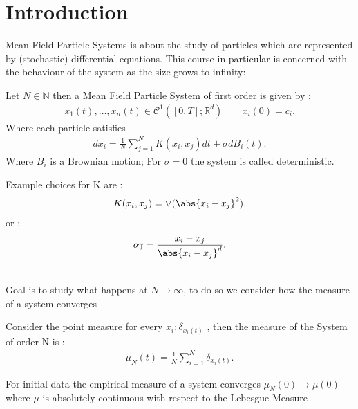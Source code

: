 \chapter{Introduction}
Mean Field Particle Systems is about the study of particles which are represented by (stochastic) differential equations.
This course in particular is concerned with the behaviour of the system as the size grows to infinity:
\begin{definition}
 Let $N \in  \mathbb{N}$ then a Mean Field Particle System of first order is given by : 
 \begin{align*}
   x_1(t),\ldots ,x_n(t) \in  \mathcal{C}^{1}([0,T];\mathbb{R}^{d } )  \qquad x_i(0) = c_i
 .\end{align*}
 Where each particle satisfies 
 \begin{align*}
   d x_i = \frac{1}{N} \sum_{j=1}^{N} K(x_i,x_j) dt + \sigma dB_i(t)
 .\end{align*}
 Where $B_i$ is a Brownian motion; For $\sigma  = 0$ the system is called deterministic.
\end{definition}
\begin{comment}
  The term mean comes from the symmetric way the particles interact with each other.
\end{comment}
\begin{example}
 Example choices for K are : 
 \begin{align*}
  K(x_{i},x_{j}) = \triangledown(\abs{x_i - x_j}^2)
 .\end{align*}
 or : 
 \begin{align*}
   o \gamma  = \frac{x_i-x_j}{\abs{x_i - x_j}^{d } }
 .\end{align*}
\end{example}
\hspace{0mm}\\
Goal is to study what happens at $N \to \infty$, to do so we consider how the measure of a system converges  
\begin{definition}
  Consider the point measure for every $x_i : \delta_{x_{i}(t)}$ , then the measure of the System of order N is : 
 \begin{align*}
   \mu_N(t) = \frac{1}{N} \sum_{i=1}^{N} \delta_{x_{i}(t)}
 .\end{align*}
\end{definition}
\begin{assumption}
  For initial data the empirical measure of a system converges $\mu_N(0) \to \mu(0)$ where $\mu $ is absolutely continuous with respect to the Lebesgue Measure
\end{assumption}

